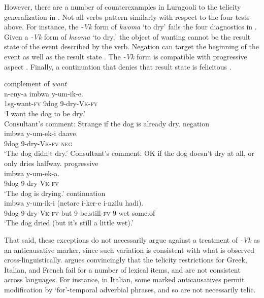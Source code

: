 \documentclass[output=paper]{langsci/langscibook}
\begin{document}
However, there are a number of counterexamples in Luragooli to the telicity generalization in . Not all verbs pattern similarly with respect to the four tests above. For instance, the \textit{-Vk} form of \textit{kwoma} ‘to dry’ fails the four diagnostics in . Given a \textit{-Vk} form of \textit{kwoma} ‘to dry,’ the object of wanting cannot be the result state  of the event described by the verb. Negation can target the beginning of the event as well as the result state . The \textit{-Vk} form is compatible with progressive aspect . Finally, a continuation that denies that result state is felicitous .

\ea\label{ex:gluckman:16} 
  \ea\label{ex:gluckman:16a}
  {{complement of} {\textit{want}}}\\
  \gll n-eny-a          imbwa y-um-ik-e.\\
      1sg-want-\textsc{fv} 9dog    9-dry-\textsc{Vk}-\textsc{fv}\\
  \glt ‘I want the dog to be dry.’\\
  \glt Consultant’s comment: Strange if the dog is already dry.
  \ex\label{ex:gluckman:16b}
  {{negation}}\\
  \gll imbwa y-um-ek-i     daave.\\
      9dog    9-dry-\textsc{Vk}-\textsc{fv} \textsc{neg}\\
  \glt ‘The dog didn’t dry.’
  \glt Consultant’s comment: OK if the dog doesn’t dry at all, or only dries halfway.
  \ex\label{ex:gluckman:16c}
  {{progressive}}\\
  \gll imbwa y-um-ek-a.\\
      9dog   9-dry\textit{-}\textsc{Vk}-\textsc{fv}\\
  \glt ‘The dog is drying.’
  \ex\label{ex:gluckman:16d}
  {{continuation}}\\
  \gll imbwa y-um-ik-i      (netare i-ker-e         i-nzilu hadi).\\
      9dog   9-dry\textit{-}\textsc{Vk}-\textsc{fv} but       9-be.still-\textsc{fv} 9-wet some.of\\
  \glt ‘The dog dried (but it’s still a little wet).’
  \z
\z

That said, these exceptions do not necessarily argue against a treatment of \textit{-Vk} as an anticausative marker, since such variation is consistent with what is observed cross-linguistically. \citet{Schäfer2008} argues convincingly that the telicity restrictions for Greek, Italian, and French fail for a number of lexical items, and are not consistent across languages. For instance, in Italian, some marked anticausatives permit modification by ‘for’-temporal adverbial phrases, and so are not necessarily telic.
\end{document}
